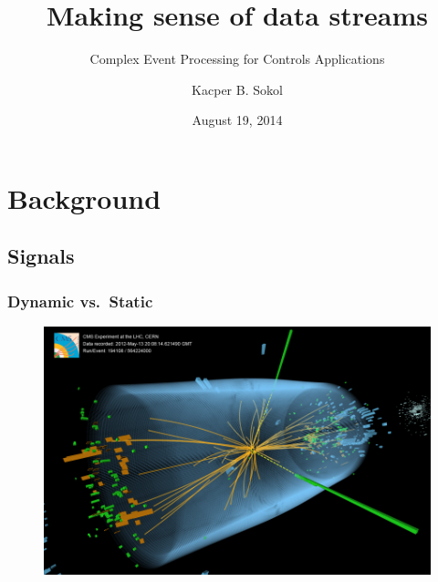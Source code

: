 \documentclass[aspectratio=169]{beamer}
\begin{document}
\title{Making sense of data streams}
\subtitle{Complex Event Processing for Controls Applications}
\author{Kacper B. Sokol}
\date{August 19, 2014}

\begin{frame}[plain]
	\titlepage
\end{frame}



\section{Background} 
  \subsection{Signals}
  \begin{frame}[foot]
    \frametitle{Dynamic vs.\ Static}
    \begin{figure}
      \includegraphics[height=.95\textheight, width=.95\textwidth, keepaspectratio]{./gfx/CMS.png}
    \end{figure}
  \end{frame}
\end{document}
